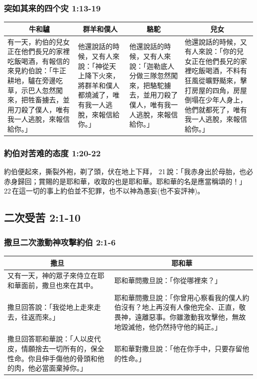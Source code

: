 \subsubsection{突如其来的四个灾 1:13-19}
\begin{table}[H]
\centering 
\begin{tabular}{p{13.9em}|p{}|p{}|p{14.4em}}    \toprule 
\multicolumn{1}{c|}{牛和驢}&\multicolumn{1}{c|}{群羊和僕人}&\multicolumn{1}{c|}{駱駝}&\multicolumn{1}{c}{兒女}\\\midrule     
有一天，約伯的兒女正在他們長兄的家裡吃飯喝酒，有報信的來見約伯說：「牛正耕地，驢在旁邊吃草，示巴人忽然闖來，把牲畜擄去，並用刀殺了僕人，唯有我一人逃脫，來報信給你。」
&他還說話的時候，又有人來說：「神從天上降下火來，將群羊和僕人都燒滅了，唯有我一人逃脫，來報信給你。」
&他還說話的時候，又有人來說：「迦勒底人分做三隊忽然闖來，把駱駝擄去，並用刀殺了僕人，唯有我一人逃脫，來報信給你。」
&他還說話的時候，又有人來說：「你的兒女正在他們長兄的家裡吃飯喝酒，不料有狂風從曠野颳來，擊打房屋的四角，房屋倒塌在少年人身上，他們就都死了，唯有我一人逃脫，來報信給你。」\\\bottomrule
\end{tabular} 
\end{table}

\subsubsection{約伯对苦难的态度 1:20-22}
約伯便起來，撕裂外袍，剃了頭，伏在地上下拜， 21 說：「我赤身出於母胎，也必赤身歸回；賞賜的是耶和華，收取的也是耶和華。耶和華的名是應當稱頌的！」 22 在這一切的事上約伯並不犯罪，也不以神為愚妄(也不妄評神)。

\subsection{二次受苦 2:1-10}
\subsubsection{撒旦二次激動神攻擊約伯 2:1-6}
\begin{table}[H]
\centering
\begin{tabular}{p{26.8em}|p{}}    \toprule
\multicolumn{1}{c|}{撒旦}&\multicolumn{1}{c}{耶和華}\\ \midrule
又有一天，神的眾子來侍立在耶和華面前，撒旦也來在其中。 
&耶和華問撒旦說：「你從哪裡來？」\\ \midrule
撒旦回答說：「我從地上走來走去，往返而來。」&耶和華問撒旦說：「你曾用心察看我的僕人約伯沒有？地上再沒有人像他完全、正直，敬畏神，遠離惡事。你雖激動我攻擊他，無故地毀滅他，他仍然持守他的純正。」\\ \midrule
撒旦回答耶和華說：「人以皮代皮，情願捨去一切所有的，保全性命。你且伸手傷他的骨頭和他的肉，他必當面棄掉你。」&耶和華對撒旦說：「他在你手中，只要存留他的性命。」\\    \bottomrule
\end{tabular}
\end{table}


